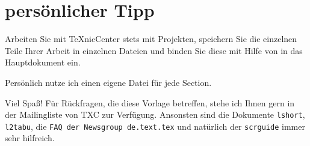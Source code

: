 \documentclass[a4paper,%
twoside,							%
headsepline=true,				%
footsepline=true,				%
headings=normal,
listof=totoc,					%
bibliography=totoc,			%
listof=entryprefix,
]
{scrartcl}
\begin{document}
\section{persönlicher Tipp}
Arbeiten Sie mit TeXnicCenter stets mit Projekten, speichern Sie die einzelnen Teile Ihrer Arbeit in einzelnen Dateien und binden Sie diese mit Hilfe von \verb## in das Hauptdokument ein.

Persönlich nutze ich einen eigene Datei für jede Section. 

Viel Spaß! Für Rückfragen, die diese Vorlage betreffen, stehe ich Ihnen gern in der Mailingliste von TXC zur Verfügung. Ansonsten sind die Dokumente \texttt{lshort}, \texttt{l2tabu}, die \texttt{FAQ der Newsgroup de.text.tex} und natürlich der \texttt{scrguide} immer sehr hilfreich.

\newpage
\listoftables			%
\newpage
\listoffigures				%
\newpage
\lstlistoflistings
\newpage
%
\nocite{*} %
\newpage
{}
\renewcommand{\bibname}{Literatur}
\nocite{*} %

\printbibliography[nottype = online, title = Literaturverzeichnis,heading	= subbibliography]
\printbibliography[
	type 		= online,						%
	title		= {Online-Quellen},	%
	heading	= subbibliography
]
\end{document}
